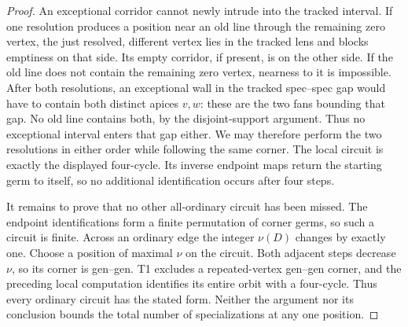 \begin{proof}
An exceptional corridor cannot newly intrude into the tracked interval.
If one resolution produces a position near an old line through the
remaining zero vertex, the just resolved, different vertex lies in the
tracked lens and blocks emptiness on that side. Its empty corridor, if
present, is on the other side. If the old line does not contain the
remaining zero vertex, nearness to it is impossible. After both
resolutions, an exceptional wall in the tracked spec--spec gap would
have to contain both distinct apices $v,w$: these are the two fans
bounding that gap. No old line contains both, by the disjoint-support
argument. Thus no exceptional interval enters that gap either.
We may therefore perform the two resolutions in either order while
following the same corner. The local circuit is exactly the displayed
four-cycle. Its inverse endpoint maps return the starting germ to
itself, so no additional identification occurs after four steps.

It remains to prove that no other all-ordinary circuit has been missed.
The endpoint identifications form a finite permutation of corner germs,
so such a circuit is finite. Across an ordinary edge the integer
$\nu(D)$ changes by exactly one. Choose a position of maximal $\nu$
on the circuit. Both adjacent steps decrease $\nu$, so its corner is
gen--gen. T1 excludes a repeated-vertex gen--gen corner, and the preceding
local computation identifies its entire orbit with a four-cycle.
Thus every ordinary circuit has the stated form. Neither the argument
nor its conclusion bounds the total number of specializations at any
one position.
\end{proof}


